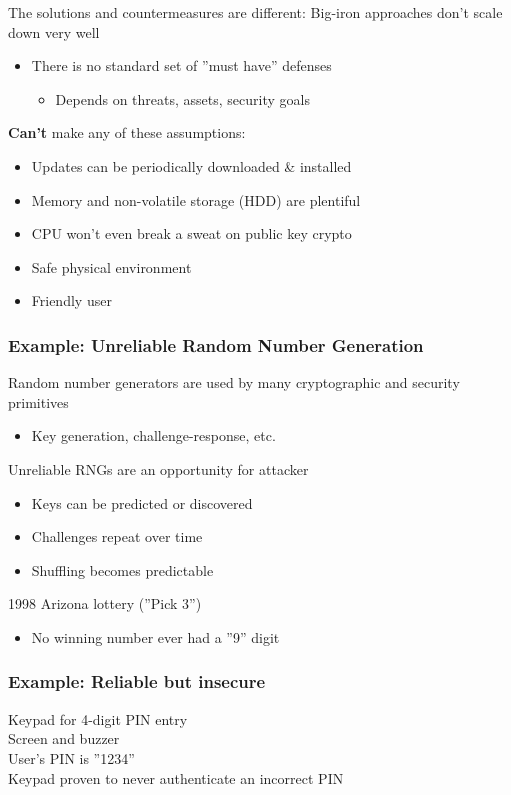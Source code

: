 The solutions and countermeasures are different:
Big-iron approaches don't scale down very well
\begin{itemize}
  \item There is no standard set of ''must have'' defenses
        \begin{itemize}
          \item Depends on threats, assets, security goals
        \end{itemize}
\end{itemize}
\textbf{Can't} make any of these assumptions:
\begin{itemize}
  \item Updates can be periodically downloaded \& installed
  \item Memory and non-volatile storage (HDD) are plentiful
  \item CPU won't even break a sweat on public key crypto
  \item Safe physical environment
  \item Friendly user
\end{itemize}

\subsubsection{Example: Unreliable Random Number Generation}
Random number generators are used by many cryptographic and security primitives
\begin{itemize}
  \item Key generation, challenge-response, etc.
\end{itemize}
Unreliable RNGs are an opportunity for attacker
\begin{itemize}
  \item Keys can be predicted or discovered
  \item Challenges repeat over time
  \item Shuffling becomes predictable
\end{itemize}
1998 Arizona lottery (''Pick 3'')
\begin{itemize}
  \item No winning number ever had a ''9'' digit
\end{itemize}

\subsubsection{Example: Reliable but insecure}
Keypad for 4-digit PIN entry\\
Screen and buzzer\\
User's PIN is ''1234''\\
Keypad proven to never authenticate an incorrect PIN\\

